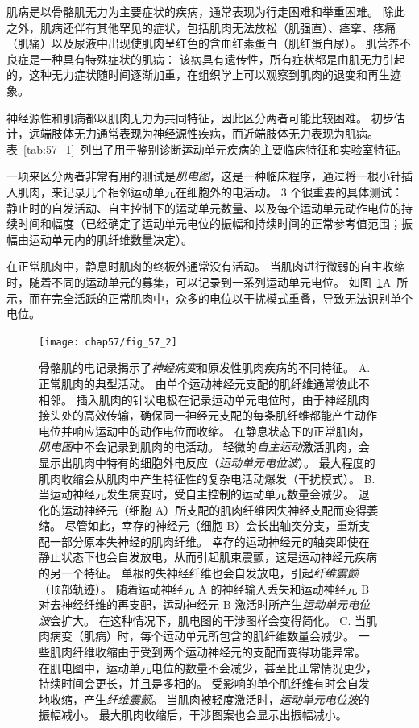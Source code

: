 肌病是以骨骼肌无力为主要症状的疾病，通常表现为行走困难和举重困难。
除此之外，肌病还伴有其他罕见的症状，包括肌肉无法放松（肌强直）、痉挛、疼痛（肌痛）以及尿液中出现使肌肉呈红色的含血红素蛋白（肌红蛋白尿）。
肌营养不良症是一种具有特殊症状的肌病：
该病具有遗传性，所有症状都是由肌无力引起的，这种无力症状随时间逐渐加重，在组织学上可以观察到肌肉的退变和再生迹象。


神经源性和肌病都以肌肉无力为共同特征，因此区分两者可能比较困难。
初步估计，远端肢体无力通常表现为神经源性疾病，而近端肢体无力表现为肌病。
表~\ref{tab:57_1}~列出了用于鉴别诊断运动单元疾病的主要临床特征和实验室特征。


一项来区分两者非常有用的测试是\textit{肌电图}，这是一种临床程序，通过将一根小针插入肌肉，来记录几个相邻运动单元在细胞外的电活动。
3 个很重要的具体测试：静止时的自发活动、自主控制下的运动单元数量、以及每个运动单元动作电位的持续时间和幅度（已经确定了运动单元电位的振幅和持续时间的正常参考值范围；振幅由运动单元内的肌纤维数量决定）。


在正常肌肉中，静息时肌肉的终板外通常没有活动。
当肌肉进行微弱的自主收缩时，随着不同的运动单元的募集，可以记录到一系列运动单元电位。
如图~\ref{fig:57_2}A~所示，而在完全活跃的正常肌肉中，众多的电位以干扰模式重叠，导致无法识别单个电位。


\begin{figure}[htbp]
	\centering
	\texttt{[image: chap57/fig\_57\_2]}
	\caption{骨骼肌的电记录揭示了\textit{神经病变}和原发性肌肉疾病的不同特征。
		A. 正常肌肉的典型活动。
		由单个运动神经元支配的肌纤维通常彼此不相邻。
		插入肌肉的针状电极在记录运动单元电位时，由于神经肌肉接头处的高效传输，确保同一神经元支配的每条肌纤维都能产生动作电位并响应运动中的动作电位而收缩。
		在静息状态下的正常肌肉，\textit{肌电图}中不会记录到肌肉的电活动。
		轻微的\textit{自主运动}激活肌肉，会显示出肌肉中特有的细胞外电反应（\textit{运动单元电位波}）。
		最大程度的肌肉收缩会从肌肉中产生特征性的复杂电活动爆发（干扰模式）。
		B. 当运动神经元发生病变时，受自主控制的运动单元数量会减少。
		退化的运动神经元（细胞 A）所支配的肌肉纤维因失神经支配而变得萎缩。
		尽管如此，幸存的神经元（细胞 B）会长出轴突分支，重新支配一部分原本失神经的肌肉纤维。
		幸存的运动神经元的轴突即使在静止状态下也会自发放电，从而引起肌束震颤，这是运动神经元疾病的另一个特征。
		单根的失神经纤维也会自发放电，引起\textit{纤维震颤}（顶部轨迹）。
		随着运动神经元 A 的神经输入丢失和运动神经元 B 对去神经纤维的再支配，运动神经元 B 激活时所产生\textit{运动单元电位波}会扩大。
		在这种情况下，肌电图的干涉图样会变得简化。
		C. 当肌肉病变（肌病）时，每个运动单元所包含的肌纤维数量会减少。
		一些肌肉纤维收缩由于受到两个运动神经元的支配而变得功能异常。
		在肌电图中，运动单元电位的数量不会减少，甚至比正常情况更少，持续时间会更长，并且是多相的。
		受影响的单个肌纤维有时会自发地收缩，产生\textit{纤维震颤}。
		当肌肉被轻度激活时，\textit{运动单元电位波}的振幅减小。
		最大肌肉收缩后，干涉图案也会显示出振幅减小。}
	\label{fig:57_2}
\end{figure}


